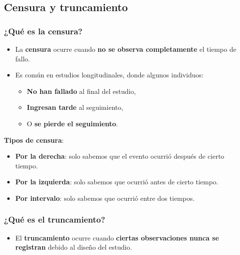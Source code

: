 \documentclass[
  letterpaper,
  DIV=11,
  numbers=noendperiod]{scrartcl}
\providecommand{\tightlist}{%
  \setlength{\itemsep}{0pt}\setlength{\parskip}{0pt}}
\begin{document}
\subsection{Censura y truncamiento}\label{sec-censura-y-truncamiento}

\subsubsection{\texorpdfstring{¿Qué es la
\textbf{censura}?}{¿Qué es la censura?}}\label{quuxe9-es-la-censura}

\begin{itemize}
\tightlist
\item
  La \textbf{censura} ocurre cuando \textbf{no se observa completamente}
  el tiempo de fallo.
\item
  Es común en estudios longitudinales, donde algunos individuos:

  \begin{itemize}
  \tightlist
  \item
    \textbf{No han fallado} al final del estudio,
  \item
    \textbf{Ingresan tarde} al seguimiento,
  \item
    O \textbf{se pierde el seguimiento}.
  \end{itemize}
\end{itemize}

\textbf{Tipos de censura}:

\begin{itemize}
\tightlist
\item
  \textbf{Por la derecha}: solo sabemos que el evento ocurrió después de
  cierto tiempo.
\item
  \textbf{Por la izquierda}: solo sabemos que ocurrió antes de cierto
  tiempo.
\item
  \textbf{Por intervalo}: solo sabemos que ocurrió entre dos tiempos.
\end{itemize}

\subsubsection{\texorpdfstring{¿Qué es el
\textbf{truncamiento}?}{¿Qué es el truncamiento?}}\label{quuxe9-es-el-truncamiento}

\begin{itemize}
\tightlist
\item
  El \textbf{truncamiento} ocurre cuando \textbf{ciertas observaciones
  nunca se registran} debido al diseño del estudio.
\end{itemize}
\end{document}
